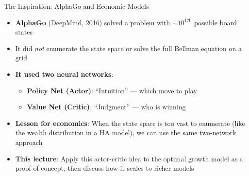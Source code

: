 \documentclass[10pt,english,aspectratio=169]{beamer}
\begin{document}
\begin{frame}{The Inspiration: AlphaGo and Economic Models}
\begin{itemize}
  \item \textbf{AlphaGo} (DeepMind, 2016) solved a problem with $\sim 10^{170}$ possible board states
  \item It did \emph{not} enumerate the state space or solve the full Bellman equation on a grid
  \medskip
  \item \textbf{It used two neural networks}:
    \begin{itemize}
      \item \textbf{Policy Net (Actor)}: ``Intuition'' --- which move to play
      \item \textbf{Value Net (Critic)}: ``Judgment'' --- who is winning
    \end{itemize}
  \medskip
  \item \textbf{Lesson for economics}: When the state space is too vast to enumerate (like the wealth distribution in a HA model), we can use the same two-network approach
  \medskip
  \item \textbf{This lecture}: Apply this actor-critic idea to the optimal growth model as a proof of concept, then discuss how it scales to richer models
\end{itemize}
\end{frame}
\end{document}
